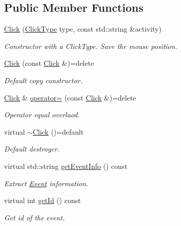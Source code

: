 \subsection*{Public Member Functions}
\begin{DoxyCompactItemize}
\item 
\hyperlink{class_spider_1_1_event_1_1_click_a81c8bc490c33205c434b0c2e8db4b6f5}{Click} (\hyperlink{namespace_spider_1_1_event_ae178d39ebb8937d04ffe6ead8f306fd0}{Click\+Type} type, const std\+::string \&activity)
\begin{DoxyCompactList}\small\item\em Constructor with a Click\+Type. Save the mouse position. \end{DoxyCompactList}\item 
\mbox{\label{class_spider_1_1_event_1_1_click_ac6170505ba14c87d8c8c83f9c9cc7000}} 
\hyperlink{class_spider_1_1_event_1_1_click_ac6170505ba14c87d8c8c83f9c9cc7000}{Click} (const \hyperlink{class_spider_1_1_event_1_1_click}{Click} \&)=delete
\begin{DoxyCompactList}\small\item\em Default copy constructor. \end{DoxyCompactList}\item 
\hyperlink{class_spider_1_1_event_1_1_click}{Click} \& \hyperlink{class_spider_1_1_event_1_1_click_a857c3a0ca04ebce50cd170ec30e0a891}{operator=} (const \hyperlink{class_spider_1_1_event_1_1_click}{Click} \&)=delete
\begin{DoxyCompactList}\small\item\em Operator equal overlaod. \end{DoxyCompactList}\item 
\mbox{\label{class_spider_1_1_event_1_1_click_a83a5ae5f70a0519d131a53c0a9b9c366}} 
virtual \hyperlink{class_spider_1_1_event_1_1_click_a83a5ae5f70a0519d131a53c0a9b9c366}{$\sim$\+Click} ()=default
\begin{DoxyCompactList}\small\item\em Default destroyer. \end{DoxyCompactList}\item 
virtual std\+::string \hyperlink{class_spider_1_1_event_1_1_click_a916e746dc2145859f697de4d9f64cd00}{get\+Event\+Info} () const
\begin{DoxyCompactList}\small\item\em Extract \hyperlink{namespace_spider_1_1_event}{Event} information. \end{DoxyCompactList}\item 
virtual int \hyperlink{class_spider_1_1_event_1_1_click_a32b810199a69b799589b680bfb9c287d}{get\+Id} () const
\begin{DoxyCompactList}\small\item\em Get id of the event. \end{DoxyCompactList}\end{DoxyCompactItemize}

